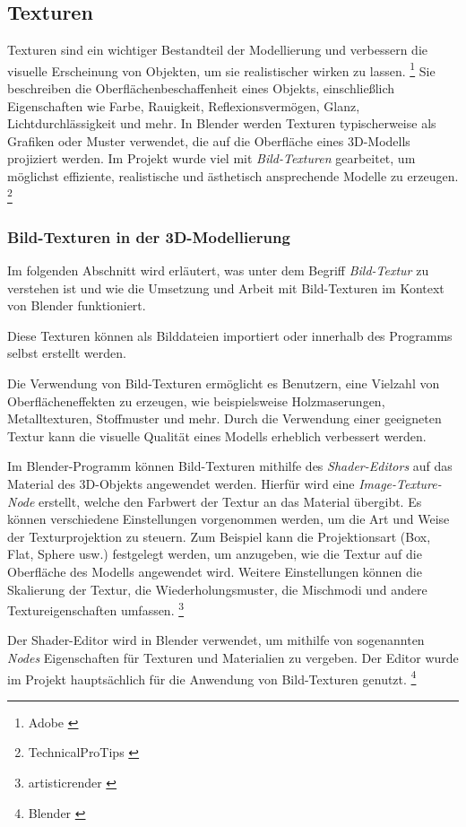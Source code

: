 \subsection{Texturen}
Texturen sind ein wichtiger Bestandteil der Modellierung und verbessern die visuelle Erscheinung von Objekten, um sie realistischer wirken zu lassen. \footnote{Adobe \cite{What are 3d textures}}  Sie beschreiben die Oberflächenbeschaffenheit eines Objekts, einschließlich Eigenschaften wie Farbe, Rauigkeit, Reflexionsvermögen, Glanz, Lichtdurchlässigkeit und mehr. In Blender werden Texturen typischerweise als Grafiken oder Muster verwendet, die auf die Oberfläche eines 3D-Modells projiziert werden. Im Projekt wurde viel mit \textit{Bild-Texturen} gearbeitet, um möglichst effiziente, realistische und ästhetisch ansprechende Modelle zu erzeugen. \footnote{TechnicalProTips \cite{Textur}}

\subsubsection{Bild-Texturen in der 3D-Modellierung} \label{sec:bildtextures}
Im folgenden Abschnitt wird erläutert, was unter dem Begriff \textit{Bild-Textur} zu verstehen ist und wie die Umsetzung und Arbeit mit Bild-Texturen im Kontext von Blender funktioniert.

Diese Texturen können als Bilddateien importiert oder innerhalb des Programms selbst erstellt werden.

Die Verwendung von Bild-Texturen ermöglicht es Benutzern, eine Vielzahl von Oberflächeneffekten zu erzeugen, wie beispielsweise Holzmaserungen, Metalltexturen, Stoffmuster und mehr. Durch die Verwendung einer geeigneten Textur kann die visuelle Qualität eines Modells erheblich verbessert werden.

Im Blender-Programm können Bild-Texturen mithilfe des \textit{Shader-Editors} auf das Material des 3D-Objekts angewendet werden. Hierfür wird eine \textit{Image-Texture-Node} erstellt, welche den Farbwert der Textur an das Material übergibt. Es können verschiedene Einstellungen vorgenommen werden, um die Art und Weise der Texturprojektion zu steuern. Zum Beispiel kann die Projektionsart (Box, Flat, Sphere usw.) festgelegt werden, um anzugeben, wie die Textur auf die Oberfläche des Modells angewendet wird. Weitere Einstellungen können die Skalierung der Textur, die Wiederholungsmuster, die Mischmodi und andere Textureigenschaften umfassen. \footnote{artisticrender \cite{Bild-Texturen}}

Der Shader-Editor wird in Blender verwendet, um mithilfe von sogenannten \textit{Nodes} Eigenschaften für Texturen und Materialien zu vergeben. Der Editor wurde im Projekt hauptsächlich für die Anwendung von Bild-Texturen genutzt. \footnote{Blender \cite{Node-Introduction}}

